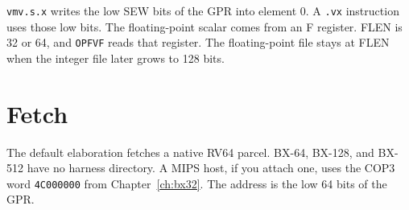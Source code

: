 \texttt{vmv.s.x} writes the low SEW bits of the GPR into element 0. A \texttt{.vx} instruction uses those low bits. The floating-point scalar comes from an F register. FLEN is 32 or 64, and \texttt{OPFVF} reads that register. The floating-point file stays at FLEN when the integer file later grows to 128 bits.

\section{Fetch}

The default elaboration fetches a native RV64 parcel. BX-64, BX-128, and BX-512 have no harness directory. A MIPS host, if you attach one, uses the COP3 word \texttt{4C000000} from Chapter~\ref{ch:bx32}. The address is the low 64 bits of the GPR.

